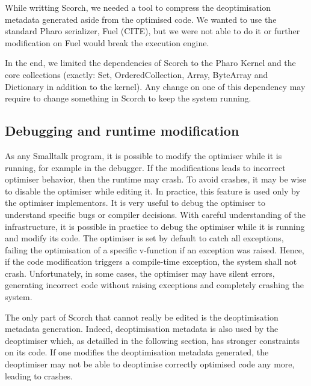 \documentclass[a4paper,12pt,twoside]{../includes/ThesisStyle}
\begin{document}
While writting Scorch, we needed a tool to compress the deoptimisation metadata generated aside from the optimised code. We wanted to use the standard Pharo serializer, Fuel (CITE), but we were not able to do it or further modification on Fuel would break the execution engine.

In the end, we limited the dependencies of Scorch to the Pharo Kernel and the core collections (exactly: Set, OrderedCollection, Array, ByteArray and Dictionary in addition to the kernel). Any change on one of this dependency may require to change something in Scorch to keep the system running.

\subsection{Debugging and runtime modification}



As any Smalltalk program, it is possible to modify the optimiser while it is running, for example in the debugger. If the modifications leads to incorrect optimiser behavior, then the runtime may crash. To avoid crashes, it may be wise to disable the optimiser while editing it. In practice, this feature is used only by the optimiser implementors. It is very useful to debug the optimiser to understand specific bugs or compiler decisions. With careful understanding of the infrastructure, it is possible in practice to debug the optimiser while it is running and modify its code. The optimiser is set by default to catch all exceptions, failing the optimisation of a specific v-function if an exception was raised. Hence, if the code modification triggers a compile-time exception, the system shall not crash. Unfortunately, in some cases, the optimiser may have silent errors, generating incorrect code without raising exceptions and completely crashing the system.

The only part of Scorch that cannot really be edited is the deoptimisation metadata generation. Indeed, deoptimisation metadata is also used by the deoptimiser which, as detailled in the following section, has stronger constraints on its code. If one modifies the deoptimisation metadata generated, the deoptimiser may not be able to deoptimise correctly optimised code any more, leading to crashes.
\end{document}
